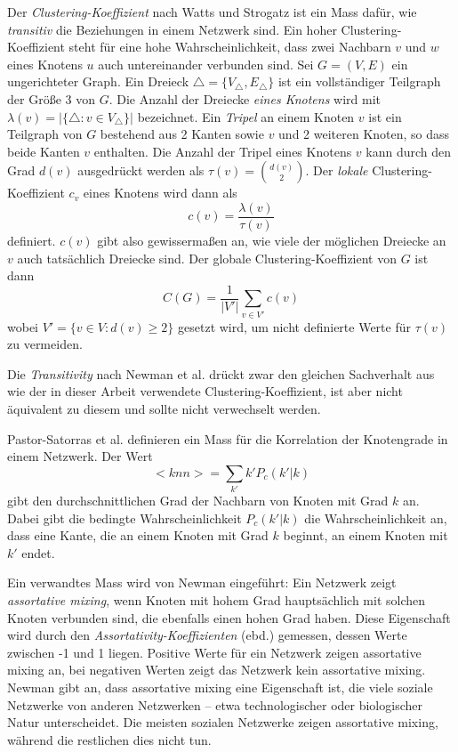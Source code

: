 Der \emph{Clustering-Koeffizient} nach Watts und Strogatz ist ein Mass
dafür, wie \emph{transitiv} die Beziehungen in einem Netzwerk
sind. Ein hoher Clustering-Koeffizient steht für eine hohe
Wahrscheinlichkeit, dass zwei Nachbarn $v$ und $w$ eines Knotens $u$
auch untereinander verbunden sind. Sei $G = (V, E)$ ein ungerichteter
Graph. Ein Dreieck $\bigtriangleup = \{V_{\bigtriangleup},
E_{\bigtriangleup}\}$ ist ein vollständiger Teilgraph der Größe 3
von $G$. Die Anzahl der Dreiecke \emph{eines Knotens} wird mit
$\lambda(v) = |\{\bigtriangleup : v \in V_{\bigtriangleup}\}|$
bezeichnet. Ein \emph{Tripel} an einem Knoten $v$ ist ein Teilgraph
von $G$ bestehend aus 2 Kanten sowie $v$ und 2 weiteren Knoten, so
dass beide Kanten $v$ enthalten. Die Anzahl der Tripel eines Knotens
$v$ kann durch den Grad $d(v)$ ausgedrückt werden als
$\tau(v)=\binom{d(v)}{2}$. Der \emph{lokale} Clustering-Koeffizient
$c_v$ eines Knotens wird dann als
\begin{equation}
  \label{eq:5}
  c(v) = \frac{\lambda(v)}{\tau(v)}
\end{equation}
definiert. $c(v)$ gibt also gewissermaßen an, wie viele der
möglichen Dreiecke an $v$ auch tatsächlich Dreiecke sind. Der
globale Clustering-Koeffizient von $G$ ist dann
\begin{equation}
  \label{eq:6}
  C(G) = \frac{1}{|V'|} \sum_{v \in V'}c(v)
\end{equation}
wobei $V' = \{v \in V : d(v) \ge 2\}$ gesetzt wird, um nicht
definierte Werte für $\tau(v)$ zu vermeiden.

Die \emph{Transitivity} nach Newman et al. drückt zwar den gleichen
Sachverhalt aus wie der in dieser Arbeit verwendete
Clustering-Koeffizient, ist aber nicht äquivalent zu diesem und
sollte nicht verwechselt werden.

Pastor-Satorras et al. definieren ein Mass für die Korrelation der
Knotengrade in einem Netzwerk\cite{PhysRevLett.87.258701}. Der Wert
\begin{equation}
  \label{eq:9}
  <knn> = \sum_{k'} k'P_c (k'|k)
\end{equation}
gibt den durchschnittlichen Grad der Nachbarn von Knoten mit Grad $k$
an.  Dabei gibt die bedingte Wahrscheinlichkeit $P_c(k'|k)$ die
Wahrscheinlichkeit an, dass eine Kante, die an einem Knoten mit Grad
$k$ beginnt, an einem Knoten mit $k'$ endet.

Ein verwandtes Mass wird von Newman eingeführt: Ein Netzwerk zeigt
\emph{assortative mixing}, wenn Knoten mit hohem Grad hauptsächlich
mit solchen Knoten verbunden sind, die ebenfalls einen hohen Grad
haben\cite{PhysRevLett.89.208701}. Diese Eigenschaft wird durch den
\emph{Assortativity-Koeffizienten} (ebd.)  gemessen, dessen Werte
zwischen -1 und 1 liegen. Positive Werte für ein Netzwerk zeigen
assortative mixing an, bei negativen Werten zeigt das Netzwerk kein
assortative mixing. Newman gibt an, dass assortative mixing eine
Eigenschaft ist, die viele soziale Netzwerke von anderen Netzwerken --
etwa technologischer oder biologischer Natur unterscheidet. Die
meisten sozialen Netzwerke zeigen assortative mixing, während die
restlichen dies nicht tun.

